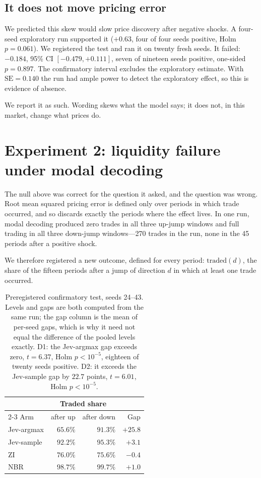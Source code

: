 \documentclass[11pt]{article}
\begin{document}
\subsection{It does not move pricing error}

We predicted this skew would slow price discovery after negative shocks. A
four-seed exploratory run supported it ($+0.63$, four of four seeds positive,
Holm $p=0.061$). We registered the test and ran it on twenty fresh seeds. It
failed: $-0.184$, 95\% CI $[-0.479, +0.111]$, seven of nineteen seeds positive,
one-sided $p=0.897$. The confirmatory interval excludes the exploratory
estimate. With $\mathrm{SE}=0.140$ the run had ample power to detect the
exploratory effect, so this is evidence of absence.

We report it as such. Wording skews what the model says; it does not, in this
market, change what prices do.

\section{Experiment 2: liquidity failure under modal decoding}
\label{sec:liquidity}

The null above was correct for the question it asked, and the question was
wrong. Root mean squared pricing error is defined only over periods in which
trade occurred, and so discards exactly the periods where the effect lives. In
one run, modal decoding produced zero trades in all three up-jump windows and
full trading in all three down-jump windows---270 trades in the run, none in
the 45 periods after a positive shock.

We therefore registered a new outcome, defined for every period:
$\mathrm{traded}(d)$, the share of the fifteen periods after a jump of
direction $d$ in which at least one trade occurred.

\begin{table}[t]
\centering
\begin{tabular}{lrrr}
\toprule
& \multicolumn{2}{c}{Traded share} & \\
\cmidrule(lr){2-3}
Arm & after up & after down & Gap \\
\midrule
Jev-argmax   & $65.6\%$ & $91.3\%$ & $+25.8$ \\
Jev-sample   & $92.2\%$ & $95.3\%$ & $+3.1$ \\
ZI           & $76.0\%$ & $75.6\%$ & $-0.4$ \\
NBR          & $98.7\%$ & $99.7\%$ & $+1.0$ \\
\bottomrule
\end{tabular}
\caption{Preregistered confirmatory test, seeds 24--43. Levels and gaps are
both computed from the same run; the gap column is the mean of per-seed gaps,
which is why it need not equal the difference of the pooled levels exactly.
D1: the Jev-argmax gap exceeds zero, $t=6.37$, Holm $p<10^{-5}$, eighteen of
twenty seeds positive. D2: it exceeds the Jev-sample gap by $22.7$ points,
$t=6.01$, Holm $p<10^{-5}$.}
\label{tab:liquidity}
\end{table}
\end{document}

